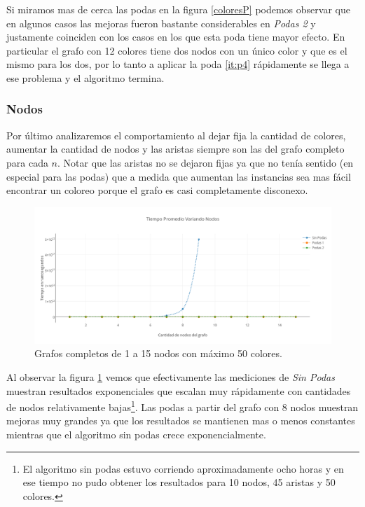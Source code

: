 Si miramos mas de cerca las podas en la figura \ref{coloresP} podemos observar que en algunos casos las mejoras fueron bastante considerables en \emph{Podas 2} y justamente coinciden con los casos en los que esta poda tiene mayor efecto. En particular el grafo con 12 colores tiene dos nodos con un único color y que es el mismo para los dos, por lo tanto a aplicar la poda \ref{it:p4} rápidamente se llega a ese problema y el algoritmo termina.\\

\subsubsection{Nodos}

Por último analizaremos el comportamiento al dejar fija la cantidad de colores, aumentar la cantidad de nodos y las aristas siempre son las del grafo completo para cada $n$. Notar que las aristas no se dejaron fijas ya que no tenía sentido (en especial para las podas) que a medida que aumentan las instancias sea mas fácil encontrar un coloreo porque el grafo es casi completamente disconexo.

 \begin{figure}[H]
	\centering
 	\includegraphics[scale=0.45]{imagenes/ej2/Nodos.png}
	\caption{Grafos completos de 1 a 15 nodos con máximo 50 colores.}
	\label{nodos}
 \end{figure}

Al observar la figura \ref{nodos} vemos que efectivamente las mediciones de \emph{Sin Podas} muestran resultados exponenciales que escalan muy rápidamente con cantidades de nodos relativamente bajas\footnote{El algoritmo sin podas estuvo corriendo aproximadamente ocho horas y en ese tiempo no pudo obtener los resultados para 10 nodos, 45 aristas y 50 colores.}. Las podas a partir del grafo con 8 nodos muestran mejoras muy grandes ya que los resultados se mantienen mas o menos constantes mientras que el algoritmo sin podas crece exponencialmente.  

